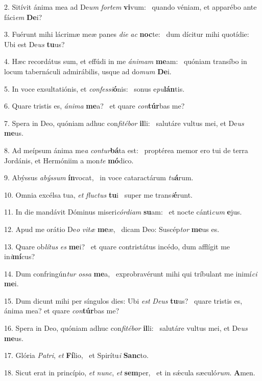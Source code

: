 2. Sitívit ánima mea ad De\textit{um} \textit{for}\textit{tem} \textbf{vi}vum: \ast\  quando véniam, et apparébo ante fáci\textit{em} \textbf{De}i?\

3. Fuérunt mihi lácrimæ meæ panes \textit{di}\textit{e} \textit{ac} \textbf{noc}te: \ast\  dum dícitur mihi quotídie: Ubi est De\textit{us} \textbf{tu}us?\

4. Hæc recordátus sum, et effúdi in me \textit{á}\textit{ni}\textit{mam} \textbf{me}am: \ast\  quóniam transíbo in locum tabernáculi admirábilis, usque ad do\textit{mum} \textbf{De}i.\

5. In voce exsultatiónis, et \textit{con}\textit{fes}\textit{si}\textbf{ó}nis: \ast\  sonus e\textit{pu}\textbf{lán}tis.\

6. Quare tristis es, \textit{á}\textit{ni}\textit{ma} \textbf{me}a? \ast\  et quare \textit{con}\textbf{túr}bas me?\

7. Spera in Deo, quóniam adhuc con\textit{fi}\textit{té}\textit{bor} \textbf{il}li: \ast\  salutáre vultus mei, et De\textit{us} \textbf{me}us.\

8. Ad meípsum ánima me\textit{a} \textit{con}\textit{tur}\textbf{bá}ta est: \ast\  proptérea memor ero tui de terra Jordánis, et Hermóniim a mon\textit{te} \textbf{mó}dico.\

9. Abýssus \textit{a}\textit{býs}\textit{sum} \textbf{ín}vocat, \ast\  in voce cataractárum \textit{tu}\textbf{á}rum.\

10. Omnia excélsa tua, \textit{et} \textit{fluc}\textit{tus} \textbf{tu}i \ast\  super me trans\textit{i}\textbf{é}runt.\

11. In die mandávit Dóminus miseri\textit{cór}\textit{di}\textit{am} \textbf{su}am: \ast\  et nocte cánti\textit{cum} \textbf{e}jus.\

12. Apud me orátio De\textit{o} \textit{vi}\textit{tæ} \textbf{me}æ, \ast\  dicam Deo: Suscép\textit{tor} \textbf{me}us es.\

13. Quare ob\textit{lí}\textit{tus} \textit{es} \textbf{me}i? \ast\  et quare contristátus incédo, dum afflígit me in\textit{i}\textbf{mí}cus?\

14. Dum confringún\textit{tur} \textit{os}\textit{sa} \textbf{me}a, \ast\  exprobravérunt mihi qui tríbulant me inimí\textit{ci} \textbf{me}i.\

15. Dum dicunt mihi per síngulos dies: Ubi \textit{est} \textit{De}\textit{us} \textbf{tu}us? \ast\  quare tristis es, ánima mea? et quare \textit{con}\textbf{túr}bas me?\

16. Spera in Deo, quóniam adhuc con\textit{fi}\textit{té}\textit{bor} \textbf{il}li: \ast\  salutáre vultus mei, et De\textit{us} \textbf{me}us.\

17. Glória \textit{Pa}\textit{tri}, \textit{et} \textbf{Fí}lio, \ast\  et Spirítu\textit{i} \textbf{Sanc}to.\

18. Sicut erat in princípio, \textit{et} \textit{nunc}, \textit{et} \textbf{sem}per, \ast\  et in sǽcula sæculó\textit{rum}. \textbf{A}men.\

